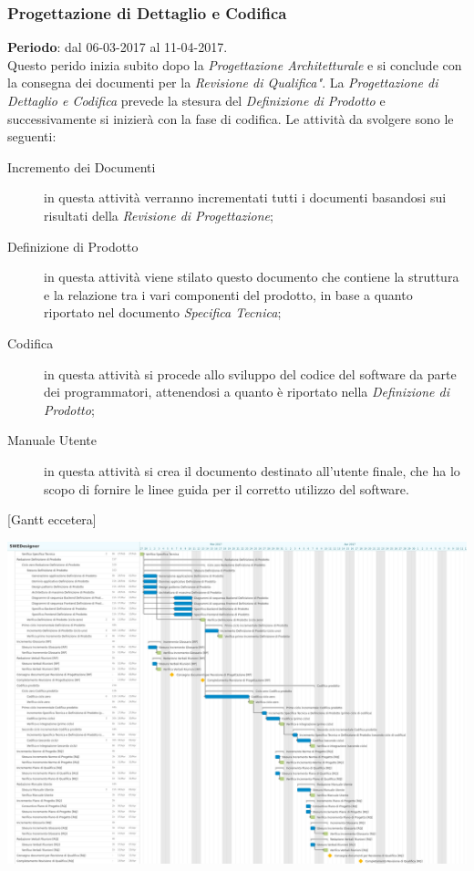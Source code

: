 	\subsubsection{Progettazione di Dettaglio e Codifica} \label{sec:PDC}
	\textbf{Periodo}: dal 06-03-2017 al 11-04-2017.	
	\\ Questo perido inizia subito dopo la \emph{Progettazione Architetturale} e si conclude con la consegna dei documenti per la \emph{Revisione di Qualifica"}. La \emph{Progettazione di Dettaglio e Codifica} prevede la stesura del \emph{Definizione di Prodotto} e successivamente si inizierà con la fase di codifica. Le attività da svolgere sono le seguenti:
	\begin{description}
		\item[Incremento dei Documenti] in questa attività verranno incrementati tutti i documenti basandosi sui risultati della \emph{Revisione di Progettazione}; 
		\item[Definizione di Prodotto] in questa attività viene stilato questo documento che contiene la struttura e la relazione tra i vari componenti del prodotto, in base a quanto riportato nel documento \emph{Specifica Tecnica};
		\item[Codifica] in questa attività si procede allo sviluppo del codice del software da parte dei programmatori, attenendosi a quanto è riportato nella \emph{Definizione di Prodotto}; 
		\item[Manuale Utente] in questa attività si crea il documento destinato all'utente finale, che ha lo scopo di fornire le linee guida per il corretto utilizzo del software.
	\end{description}
	[Gantt eccetera]
	
	{\includegraphics[width=15cm]{img/ganttpdc.png}\par}

